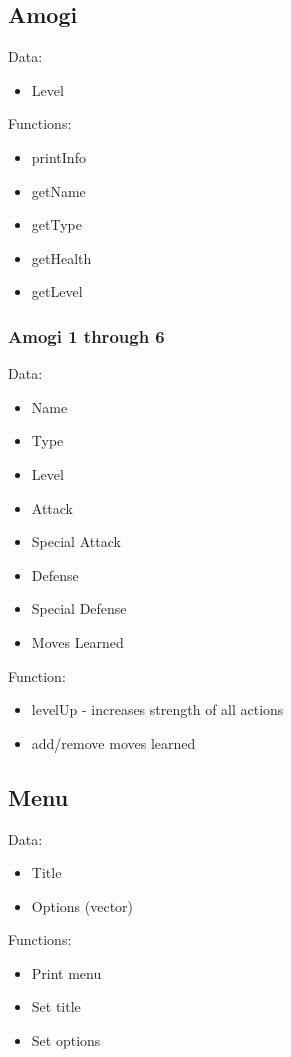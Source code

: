 \documentclass{article}
\begin{document}
\begin{multicols}{2}
    \subsection{Amogi}
    Data:
    \begin{itemize}
      \item Level
    \end{itemize}
    Functions:
    \begin{itemize}
      \item printInfo
      \item getName
      \item getType
      \item getHealth
      \item getLevel
    \end{itemize}
    
    \subsubsection{Amogi 1 through 6}
    Data:
      \begin{itemize}
        \item Name
        \item Type
        \item Level
        \item Attack
        \item Special Attack
        \item Defense
        \item Special Defense
        \item Moves Learned
      \end{itemize}
    Function:
      \begin{itemize}
        \item levelUp - increases strength of all actions
        \item add/remove moves learned
      \end{itemize}
    
    \subsection{Menu}
    Data:
    \begin{itemize}
      \item Title
      \item Options (vector)
    \end{itemize}
    Functions:
    \begin{itemize}
      \item Print menu
      \item Set title
      \item Set options
    \end{itemize}
    \end{multicols}
  
\end{document}
